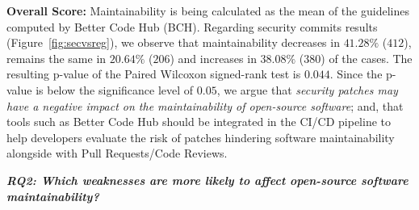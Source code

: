 \documentclass[10pt,conference]{IEEEtran}
\newcommand\Luis[1]{\nb{Luis}{mygreen}{#1}}
\begin{document}

\textbf{Overall Score:} Maintainability is being calculated as the mean of 
the guidelines computed by Better Code Hub (BCH). Regarding security 
commits results (Figure~\ref{fig:secvsreg}), we observe that
maintainability decreases in $41.28\%$ ($412$), remains the same in $20.64\%$ 
($206$) and increases in $38.08\%$ ($380$) of the cases. The resulting
p-value of the Paired Wilcoxon signed-rank test is $0.044$. Since the p-value is 
below the significance level of $0.05$, we argue that \emph{security patches 
may have a negative impact on the maintainability of open-source software}; and, 
that tools such as Better Code Hub should be integrated in the CI/CD pipeline
to help developers evaluate the risk of patches hindering software maintainability
alongside with Pull Requests/Code Reviews.
%

\textit{\textbf{RQ2: Which weaknesses are more likely to
affect open-source software maintainability?}}
\end{document}

